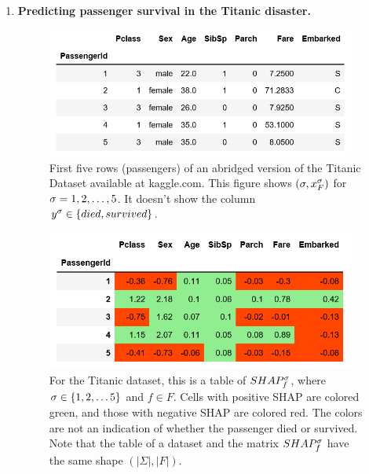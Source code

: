 \begin{enumerate}
\item {\bf Predicting passenger survival 
in the Titanic disaster.}





\begin{figure}[h!]
\centering
\includegraphics[width=4in]
{shapley/titanic-dataset-5.png}
\caption{
First five rows (passengers)
of an abridged version of the
Titanic Dataset
available at kaggle.com. 
This figure shows
$(\sigma, x^\sigma_F)$ for $\sigma=1,2,\ldots,5$.
It doesn't show the column $y^\sigma\in
\{died, survived\}$.
} 
\label{fig-titanic-dataset-5}
\end{figure}

\begin{figure}[h!]
\centering
\includegraphics[width=4in]
{shapley/titanic-shap-table.png}
\caption{For the Titanic dataset, 
this is a
table of $SHAP^\sigma_f$, where 
$\sigma\in \{1,2, \ldots 5\}$
and $f\in F$.
Cells with positive
SHAP are colored green,
and those with negative
SHAP are colored red.
The colors are not an
indication of whether
the passenger died or 
survived.
Note that the table
of a dataset and 
the matrix $SHAP_f^\sigma$
have the same shape $(|\Sigma|, |F|)$.} 
\label{fig-titanic-shap-table}
\end{figure}


\end{enumerate}
